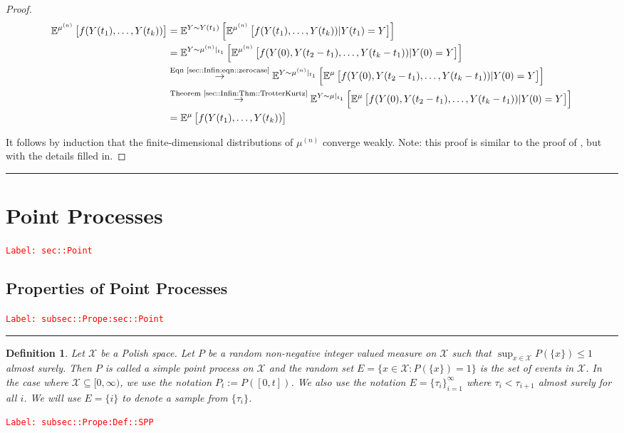 \documentclass[12pt]{article}
\newcommand{\mb}{\mathbb}
\newcommand{\mc}{\mathcal}
\newcommand{\ra}{\rightarrow}
\newcommand{\os}{\overset}
\newcommand{\te}{\text}
\newcommand{\tr}{\textcolor{red}}
\newcommand{\labe}[1]{\tr{\texttt{Label: #1}}}
\newcommand{\lin}{\rule{\linewidth}{0.4 pt}}
\newcommand{\exmu}[2]{\mb{E}^{#1}\left[#2\right]}	%
\newcommand{\x}{x}								%
\renewcommand{\t}{t}							%
\newcommand{\tp}[1]{(#1)}						%
\newcommand{\ts}[1]{_{#1}}						%
\newcommand{\sln}[1]{^{(#1)}}					%
\newcommand{\indx}[1]{_{#1}}					%
\newcommand{\m}{\mu}							%
\newcommand{\XX}{Y}								%
\newcommand{\rt}{\tau}							%
\renewcommand{\it}{k}							%
\newcommand{\rp}{P}								%
\newcommand{\spce}{\mc{X}}						%
\newcommand{\evs}{E}							%
\newtheorem{defn}[thms]{Definition}
\begin{document}
\begin{proof}
\begin{align*}
\exmu{\m\sln{n}}{f(\XX\tp{\t\indx{1}},\dots,\XX\tp{\t\indx{\it}})}&= \exmu{\XX\sim \XX\tp{\t\indx{1}}}{\exmu{\m\sln{n}}{f(\XX\tp{\t\indx{1}},\dots,\XX\tp{\t\indx{\it}})|\XX\tp{\t\indx{1}}=\XX}}\\
&=\exmu{\XX\sim \m\sln{n}|_{\t\indx{1}}}{\exmu{\m\sln{n}}{f(\XX\tp{0},\XX\tp{\t\indx{2}-\t\indx{1}},\dots,\XX\tp{\t\indx{\it}-\t\indx{1}})|\XX\tp{0}=\XX}}\\
&\os{\te{Eqn \eqref{sec::Infin:eqn::zerocase}}}{\ra} \exmu{\XX\sim \m\sln{n}|_{\t\indx{1}}}{\exmu{\m}{f(\XX\tp{0},\XX\tp{\t\indx{2}-\t\indx{1}},\dots,\XX\tp{\t\indx{\it}-\t\indx{1}})|\XX\tp{0}=\XX}}\\
&\os{\te{Theorem \ref{sec::Infin:Thm::TrotterKurtz}}}{\ra} \exmu{\XX\sim \m|_{\t\indx{1}}}{\exmu{\m}{f(\XX\tp{0},\XX\tp{\t\indx{2}-\t\indx{1}},\dots,\XX\tp{\t\indx{\it}-\t\indx{1}})|\XX\tp{0}=\XX}}\\
&=\exmu{\m}{f(\XX\tp{\t\indx{1}},\dots,\XX\tp{\t\indx{\it}})}
\end{align*}

It follows by induction that the finite-dimensional distributions of \(\m\sln{n}\) converge weakly. Note: this proof is similar to the proof of \cite[Theorem 4.2]{Kur81}, but with the details filled in.
\end{proof}

\lin 

\section{Point Processes}
\label{sec::Point}\labe{sec::Point}

\subsection{Properties of Point Processes}
\label{subsec::Prope:sec::Point}\labe{subsec::Prope:sec::Point}

\lin

\begin{defn}
Let \(\spce\) be a Polish space. Let \(\rp\) be a random non-negative integer valued measure on \(\spce\) such that \(\sup_{\x \in \spce} \rp(\{\x\})\leq 1\) almost surely. Then \(\rp\) is called a simple point process on \(\spce\) and the random set \(E = \{\x \in \spce: \rp(\{\x\}) = 1\}\) is the set of events in \(\spce\). In the case where \(\spce \subseteq [0,\infty)\), we use the notation \(\rp\ts{\t} := \rp([0,\t])\). We also use the notation \(\evs = \{\rt\indx{i}\}_{i=1}^{\infty}\) where \(\rt\indx{i} < \rt\indx{i+1}\) almost surely for all \(i\). We will use \(\evs = \{	{i}\}\) to denote a sample from \(\{\rt\indx{i}\}\).
\label{subsec::Prope:Def::SPP}
\end{defn}
\labe{subsec::Prope:Def::SPP}
\end{document}
